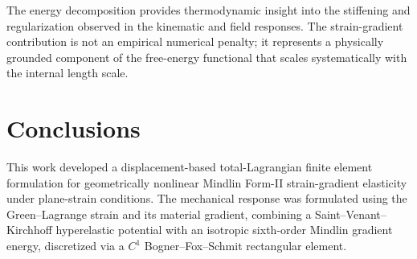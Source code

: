 \documentclass[preprint,12pt]{elsarticle}
\begin{document}
The energy decomposition provides thermodynamic insight into the stiffening and
regularization observed in the kinematic and field responses. The strain-gradient
contribution is not an empirical numerical penalty; it represents a physically grounded
component of the free-energy functional that scales systematically with the internal
length scale.


\section{Conclusions}
\label{sec:conclusions}

This work developed a displacement-based total-Lagrangian finite element
formulation for geometrically nonlinear Mindlin Form-II strain-gradient elasticity
under plane-strain conditions. The mechanical response was formulated using the
Green--Lagrange strain and its material gradient, combining a
Saint--Venant--Kirchhoff hyperelastic potential with an isotropic sixth-order
Mindlin gradient energy, discretized via a $C^1$ Bogner--Fox--Schmit
rectangular element.
\end{document}
